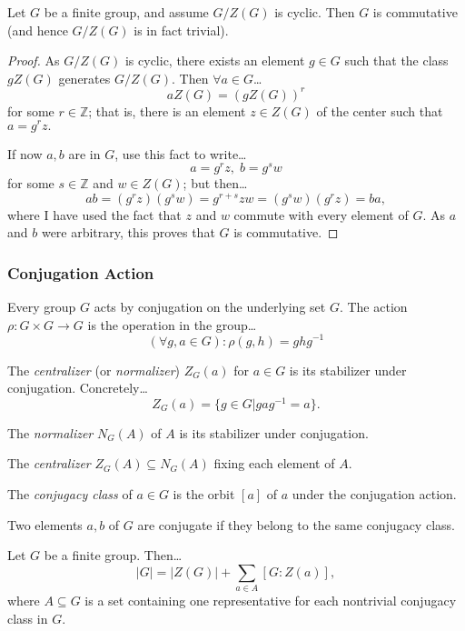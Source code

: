 \begin{lemma}
Let $G$ be a finite group, and assume $G/Z(G)$ is cyclic. Then $G$ is commutative (and hence
$G/Z(G)$ is in fact trivial).
\end{lemma}

\begin{proof}
As $G/Z(G)$ is cyclic, there exists an element $g \in G$ such that the class $gZ(G)$ generates $G/Z(G)$. Then $\forall a \in G$\dots
$$aZ(G) = (gZ(G))^r$$
for some $r \in \mathbb{Z}$; that is, there is an element $z \in Z(G)$ of the center such that $a = g^rz.$

If now $a,b$ are in $G$, use this fact to write\dots
$$a = g^rz, \; b = g^sw$$
for some $s \in \mathbb{Z}$ and $w \in Z(G)$; but then\dots
$$ab = (g^rz)(g^sw) = g^{r+s}zw = (g^sw)(g^rz) = ba,$$
where I have used the fact that $z$ and $w$ commute with every element of $G$. As $a$ and $b$ were arbitrary, this proves that $G$ is commutative.
\end{proof}

\subsubsection{Conjugation Action}\label{conjugationgroupaction}
Every group $G$ acts by conjugation on the underlying set $G$. The action $\rho : G \times G \rightarrow G$ is
the operation in the group\dots
$$(\forall g,a \in G): \rho(g,h) = ghg^{-1}$$

\label{centralizer}\label{normalizer}
The \emph{centralizer} (or \emph{normalizer}) $Z_G(a)$ for $a \in G$ is its stabilizer under conjugation. Concretely\dots
$$Z_G(a) = \{ g \in G | gag^{-1} = a \}.$$

\noindent The \emph{normalizer} $N_G(A)$ of $A$ is its stabilizer under conjugation.\newline

\noindent The \emph{centralizer} $Z_G(A) \subseteq N_G(A)$ fixing each element of $A$.

\label{conjugacyclass}
The \emph{conjugacy class} of $a \in G$ is the orbit $[a]$ of $a$ under the conjugation action.\newline

\noindent Two elements $a,b$ of $G$ are conjugate if they belong to the same conjugacy class.

\begin{proposition}
\label{classformula}
Let $G$ be a finite group. Then\dots
$$|G| = |Z(G)| + \sum_{a \in A}[G : Z(a)],$$
where $A \subseteq G$ is a set containing one representative for each nontrivial conjugacy class in $G$.
\end{proposition}

